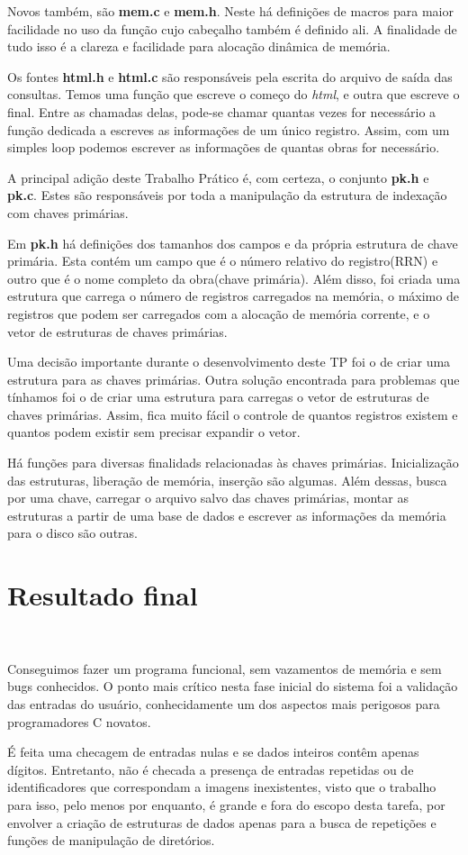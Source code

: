 \documentclass{article}
\begin{document}
Novos também, são \textbf{mem.c} e \textbf{mem.h}. Neste há definições de macros para maior facilidade no uso da função cujo cabeçalho também é definido ali. A finalidade de tudo isso é a clareza e facilidade para alocação dinâmica de memória.

Os fontes \textbf{html.h} e \textbf{html.c} são responsáveis pela escrita do arquivo de saída das consultas. Temos uma função que escreve o começo do \textit{html}, e outra que escreve o final. Entre as chamadas delas, pode-se chamar quantas vezes for necessário a função dedicada a escreves as informações de um único registro. Assim, com um simples loop podemos escrever as informações de quantas obras for necessário.

A principal adição deste Trabalho Prático é, com certeza, o conjunto \textbf{pk.h} e \textbf{pk.c}. Estes são responsáveis por toda a manipulação da estrutura de indexação com chaves primárias.

Em \textbf{pk.h} há definições dos tamanhos dos campos e da própria estrutura de chave primária. Esta contém um campo que é o número relativo do registro(RRN) e outro que é o nome completo da obra(chave primária). Além disso, foi criada uma estrutura que carrega o número de registros carregados na memória, o máximo de registros que podem ser carregados com a alocação de memória corrente, e o vetor de estruturas de chaves primárias. 

Uma decisão importante durante o desenvolvimento deste TP foi o de criar uma estrutura para as chaves primárias. Outra solução encontrada para problemas que tínhamos foi o de criar uma estrutura para carregas o vetor de estruturas de chaves primárias. Assim, fica muito fácil o controle de quantos registros existem e quantos podem existir sem precisar expandir o vetor.

Há funções para diversas finalidads relacionadas às chaves primárias. Inicialização das estruturas, liberação de memória, inserção são algumas. Além dessas, busca por uma chave, carregar o arquivo salvo das chaves primárias, montar as estruturas a partir de uma base de dados e escrever as informações da memória para o disco são outras.

\section{Resultado final}\

Conseguimos fazer um programa funcional, sem vazamentos de memória e sem bugs conhecidos. O ponto mais crítico nesta fase inicial do sistema foi a validação das entradas do usuário, conhecidamente um dos aspectos mais perigosos para programadores C novatos.

É feita uma checagem de entradas nulas e se dados inteiros contêm apenas dígitos. Entretanto, não é checada a presença de entradas repetidas ou de identificadores que correspondam a imagens inexistentes, visto que o trabalho para isso, pelo menos por enquanto, é grande e fora do escopo desta tarefa, por envolver a criação de estruturas de dados apenas para a busca de repetições e funções de manipulação de diretórios.
\end{document}
